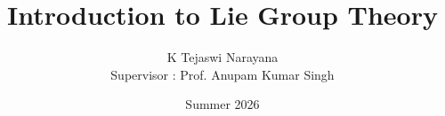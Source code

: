 \documentclass[a4paper,12pt]{report}
\title{\Huge\textbf{Introduction to Lie Group Theory}}
\author{K Tejaswi Narayana \\ Supervisor : Prof. Anupam Kumar Singh}
\date{Summer 2026}
\theoremstyle{definition}
\theoremstyle{remark}
\begin{document}
  \maketitle


  \tableofcontents
  \newpage


  
  
  
  

  \nocite{baker, tapp}
  
  
\end{document}
